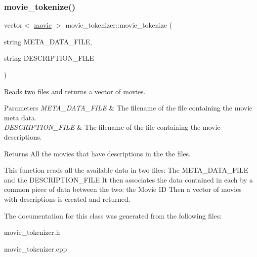 \subsubsection{\texorpdfstring{movie\+\_\+tokenize()}{movie\_tokenize()}}
{\footnotesize\ttfamily vector$<$ \hyperlink{classmovie}{movie} $>$ movie\+\_\+tokenizer\+::movie\+\_\+tokenize (\begin{DoxyParamCaption}\item[{string}]{M\+E\+T\+A\+\_\+\+D\+A\+T\+A\+\_\+\+F\+I\+LE,  }\item[{string}]{D\+E\+S\+C\+R\+I\+P\+T\+I\+O\+N\+\_\+\+F\+I\+LE }\end{DoxyParamCaption})}



Reads two files and returns a vector of movies. 


\begin{DoxyParams}{Parameters}
{\em M\+E\+T\+A\+\_\+\+D\+A\+T\+A\+\_\+\+F\+I\+LE} & The filename of the file containing the movie meta data. \\
\hline
{\em D\+E\+S\+C\+R\+I\+P\+T\+I\+O\+N\+\_\+\+F\+I\+LE} & The filename of the file containing the movie descriptions. \\
\hline
\end{DoxyParams}
\begin{DoxyReturn}{Returns}
All the movies that have descriptions in the the files.
\end{DoxyReturn}
This function reads all the available data in two files\+: The M\+E\+T\+A\+\_\+\+D\+A\+T\+A\+\_\+\+F\+I\+LE and the D\+E\+S\+C\+R\+I\+P\+T\+I\+O\+N\+\_\+\+F\+I\+LE It then associates the data contained in each by a common piece of data between the two\+: the Movie ID Then a vector of movies with descriptions is created and returned. 

The documentation for this class was generated from the following files\+:\begin{DoxyCompactItemize}
\item 
movie\+\_\+tokenizer.\+h\item 
movie\+\_\+tokenizer.\+cpp\end{DoxyCompactItemize}
